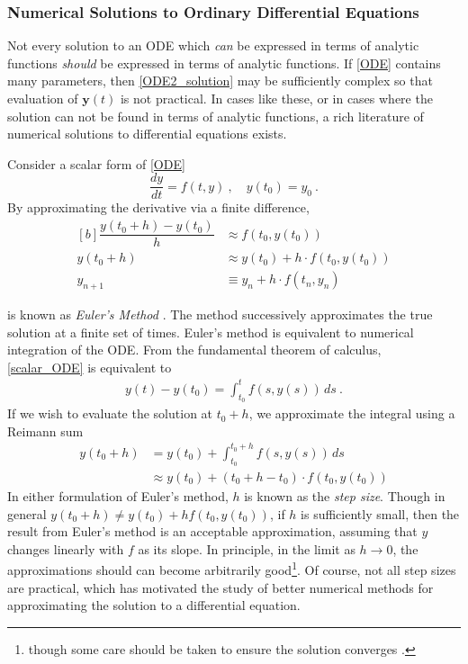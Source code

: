 \subsubsection{Numerical Solutions to Ordinary Differential Equations}

Not every solution to an ODE which \textit{can} be expressed in terms of analytic functions \textit{should} be expressed in terms of analytic functions. If \cref{ODE} contains many parameters, then \cref{ODE2_solution} may be sufficiently complex so that evaluation of $\mathbf{y}(t)$ is not practical.  In cases like these, or in cases where the solution can not be found in terms of analytic functions, a rich literature of numerical solutions to differential equations exists.

Consider a scalar form of \cref{ODE}
%
\begin{equation}\label{scalar_ODE}
	\dfrac{dy}{dt} = f(t,y) \>, \quad y(t_0) = y_0 \>.
\end{equation}
%
By approximating the derivative via a finite difference,
%
\begin{equation}\label{EuerlMethod}
\begin{aligned}[b]
\dfrac{y(t_0 + h) - y(t_0)}{h} &\approx f(t_0,y(t_0)) \\
y(t_0+h) &\approx y(t_0) + h\cdot f(t_0, y(t_0))\\
y_{n+1} & \equiv y_{n}+ h \cdot f(t_n,y_n)
\end{aligned}
\end{equation}

 is known as \textit{Euler's Method} \cite{boyce2012differential}.  The method successively approximates the true solution at a finite set of times. Euler's method is equivalent to numerical integration of the ODE.  From the fundamental theorem of calculus, \cref{scalar_ODE} is equivalent to
%
\begin{align*}
	y(t) - y(t_0) = \int_{t_0}^t f(s,y(s)) \, ds \>.
\end{align*}
%
If we wish to evaluate the solution at $ t_0+h $, we approximate the integral using a Reimann sum
%
\begin{equation}
\begin{aligned}
	y(t_0+h) &= y(t_0) + \int_{t_0}^{t_0+h}f(s,y(s)) \, ds \\
				  &\approx y(t_0) + (t_0 + h - t_0)\cdot f(t_0, y(t_0))
\end{aligned}
\end{equation}
In either formulation of Euler's method, $ h $ is known as the \textit{step size}. Though in general $ y(t_0+h) \neq y(t_0) + hf(t_0,y(t_0)) $, if $ h $ is sufficiently small, then the result from Euler's method is an acceptable approximation, assuming that $ y $ changes linearly with $ f $ as its slope. In principle, in the limit as $ h \rightarrow 0 $, the approximations should can become arbitrarily good\footnote{though some care should be taken to ensure the solution converges \cite{corless2013graduate}.}.  Of course, not all step sizes are practical, which has motivated the study of better numerical methods for approximating the solution to a differential equation.

